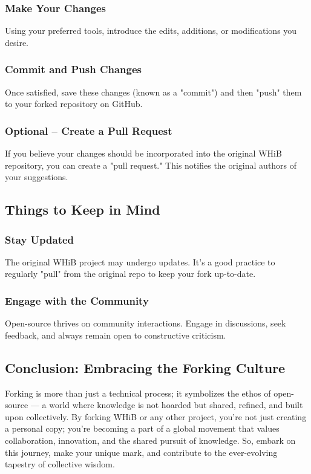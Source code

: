 \documentclass[a4paper,12pt]{book}
\begin{document}
\subsubsection*{Make Your Changes}
Using your preferred tools, introduce the edits, additions, or modifications you desire.

\subsubsection*{Commit and Push Changes}
Once satisfied, save these changes (known as a "commit") and then "push" them to your forked repository on GitHub.

\subsubsection*{Optional – Create a Pull Request}
If you believe your changes should be incorporated into the original WHiB repository, you can create a "pull request." This notifies the original authors of your suggestions.

\subsection*{Things to Keep in Mind}
\subsubsection*{Stay Updated}
The original WHiB project may undergo updates. It's a good practice to regularly "pull" from the original repo to keep your fork up-to-date.

\subsubsection*{Engage with the Community}
Open-source thrives on community interactions. Engage in discussions, seek feedback, and always remain open to constructive criticism.

\subsection*{Conclusion: Embracing the Forking Culture}
Forking is more than just a technical process; it symbolizes the ethos of open-source — a world where knowledge is not hoarded but shared, refined, and built upon collectively. By forking WHiB or any other project, you're not just creating a personal copy; you're becoming a part of a global movement that values collaboration, innovation, and the shared pursuit of knowledge. So, embark on this journey, make your unique mark, and contribute to the ever-evolving tapestry of collective wisdom.
\end{document}
